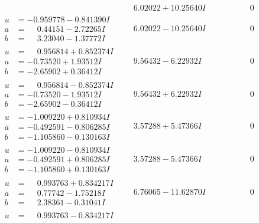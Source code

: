 \documentclass[1p]{elsarticle_modified}
\theoremstyle{definition}
\begin{document}
$$\begin{array}{c|c|c}
 & \phantom{-}6.02022 + 10.25640 I & \phantom{-0.000000 } 0 \\ \hline\begin{aligned}
u &= -0.959778 - 0.841390 I \\
a &= \phantom{-}0.44151 - 2.72265 I \\
b &= \phantom{-}3.23040 - 1.37772 I\end{aligned}
 & \phantom{-}6.02022 - 10.25640 I & \phantom{-0.000000 } 0 \\ \hline\begin{aligned}
u &= \phantom{-}0.956814 + 0.852374 I \\
a &= -0.73520 + 1.93512 I \\
b &= -2.65902 + 0.36412 I\end{aligned}
 & \phantom{-}9.56432 - 6.22932 I & \phantom{-0.000000 } 0 \\ \hline\begin{aligned}
u &= \phantom{-}0.956814 - 0.852374 I \\
a &= -0.73520 - 1.93512 I \\
b &= -2.65902 - 0.36412 I\end{aligned}
 & \phantom{-}9.56432 + 6.22932 I & \phantom{-0.000000 } 0 \\ \hline\begin{aligned}
u &= -1.009220 + 0.810934 I \\
a &= -0.492591 - 0.806285 I \\
b &= -1.105860 - 0.130163 I\end{aligned}
 & \phantom{-}3.57288 + 5.47366 I & \phantom{-0.000000 } 0 \\ \hline\begin{aligned}
u &= -1.009220 - 0.810934 I \\
a &= -0.492591 + 0.806285 I \\
b &= -1.105860 + 0.130163 I\end{aligned}
 & \phantom{-}3.57288 - 5.47366 I & \phantom{-0.000000 } 0 \\ \hline\begin{aligned}
u &= \phantom{-}0.993763 + 0.834217 I \\
a &= \phantom{-}0.77742 - 1.75218 I \\
b &= \phantom{-}2.38361 - 0.31041 I\end{aligned}
 & \phantom{-}6.76065 - 11.62870 I & \phantom{-0.000000 } 0 \\ \hline\begin{aligned}
u &= \phantom{-}0.993763 - 0.834217 I \\

\end{aligned}
\end{array}$$
\end{document}
